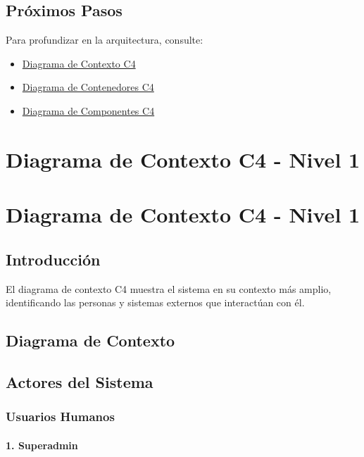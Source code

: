 \documentclass[
  spanish,
  11pt,
  letterpaper,
]{book}
\providecommand{\tightlist}{%
  \setlength{\itemsep}{0pt}\setlength{\parskip}{0pt}}
\begin{document}
\section{Próximos Pasos}\label{pruxf3ximos-pasos}

Para profundizar en la arquitectura, consulte:

\begin{itemize}
\tightlist
\item
  \href{c4-context.qmd}{Diagrama de Contexto C4}
\item
  \href{c4-containers.qmd}{Diagrama de Contenedores C4}
\item
  \href{c4-components.qmd}{Diagrama de Componentes C4}
\end{itemize}

\chapter{Diagrama de Contexto C4 - Nivel
1}\label{diagrama-de-contexto-c4---nivel-1}

\chapter{Diagrama de Contexto C4 - Nivel
1}\label{diagrama-de-contexto-c4---nivel-1-1}

\section{Introducción}\label{introducciuxf3n-1}

El diagrama de contexto C4 muestra el sistema en su contexto más amplio,
identificando las personas y sistemas externos que interactúan con él.

\section{Diagrama de Contexto}\label{diagrama-de-contexto}

\section{Actores del Sistema}\label{actores-del-sistema}

\subsection{Usuarios Humanos}\label{usuarios-humanos}

\subsubsection{1. Superadmin}\label{superadmin}
\end{document}
